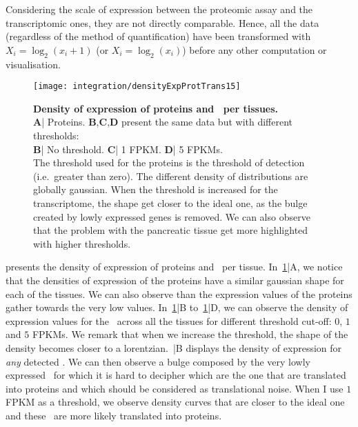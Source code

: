 Considering the scale of expression between the proteomic assay and the
transcriptomic ones, they are not directly comparable. Hence,
all the data (regardless of the method of quantification) have been transformed
with $X_{i}=\log_{2} (x_{i}+1)$ (or $X_{i}=\log_{2} (x_{i})$)
before any other computation or visualisation.


\begin{figure}%
    \texttt{[image: integration/densityExpProtTrans15]}\centering
    \caption[Density of expression of proteins and \mRNAs\ per
    tissues.]
    {\label{fig:densityExpProtTrans15}\textbf{Density of expression of
    proteins and \mRNAs\ per tissues.} \\\textbf{A}| Proteins.
    \textbf{B},\textbf{C},\textbf{D} present the same data but with
    different thresholds:
    \\\textbf{B}| No threshold. \textbf{C}| 1 \gls{FPKM}.
    \textbf{D}| 5 \glspl{FPKM}.\\The threshold used for the proteins is the
    threshold of
    detection (i.e.\ greater than zero). The different density of distributions are
    globally gaussian. When the threshold is increased for the transcriptome, the
    shape get closer to the ideal one, as the bulge created by lowly expressed
    genes is removed. We can also observe that the problem with the pancreatic
    tissue get more highlighted with higher thresholds.}
\end{figure}

 presents the density of expression
of proteins and \mRNAs\ per tissue. In~\cref{fig:densityExpProtTrans15}|A,
we notice that the densities of expression of the proteins have a similar gaussian
shape for each of the tissues. We can also observe than the expression values
of the proteins gather towards the very low values.
In~\cref{fig:densityExpProtTrans15}|B to~\cref{fig:densityExpProtTrans15}|D,
we can observe the density of expression values for
the \mRNAs\ across all the tissues for
different threshold cut-off: $0$, $1$ and $5$ \glspl{FPKM}.
We remark that when we increase the threshold, the shape
of the density becomes closer to a lorentzian.~|B
displays the density of expression for \emph{any} detected \mRNA\@. We can
then observe a bulge composed by the very lowly expressed \mRNAs\, for which it
is hard to decipher which are the one that are translated into proteins and which
should be considered as translational noise. When I use $1$ \gls{FPKM} as a threshold,
we observe density curves that are closer to the ideal one and these \mRNAs\ are
more likely translated into proteins.

